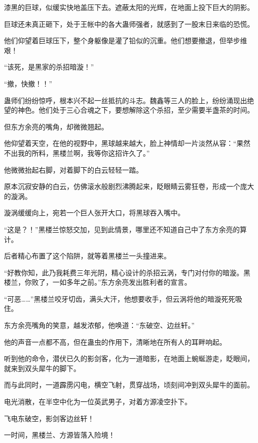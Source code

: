 \begin{this_body}
漆黑的巨球，似缓实快地盖压下去。遮蔽太阳的光辉，在地面上投下巨大的阴影。

巨球还未真正砸下，处于王帐中的各大蛊师强者，就感到了一股末日来临的恐慌。

他们仰望着巨球压下，整个身躯像是灌了铅似的沉重。他们想要撤退，但举步维艰！

“该死，是黑家的杀招暗漩！”

“撤，快撤！！”

蛊师们纷纷惊呼，根本兴不起一丝抵抗的斗志。魏鑫等三人的脸上，纷纷涌现出绝望的神色。他们处于三心合魂之下，要想解除这个杀招，至少需要半盏茶的时间。

但东方余亮的嘴角，却微微翘起。

他仰望着天空，在他的视野中，黑球越来越大，脸上神情却一片淡然从容：“果然不出我的所料，黑楼兰啊，我等你这招许久了。”

他微微抬起右脚，对着脚下的白云轻轻一踏。

原本沉寂安静的白云，仿佛滚水般剧烈沸腾起来，眨眼睛云雾狂卷，形成一个庞大的漩涡。

漩涡缓缓向上，宛若一个巨人张开大口，将黑球吞入嘴中。

“这是？！”黑楼兰惊怒交加，见到此情景，哪里还不知道自己中了东方余亮的算计。

后者精心布置了这个陷阱，就等着黑楼兰一头撞进来。

“好教你知，此乃我耗费三年光阴，精心设计的杀招云涡，专门对付你的暗漩。黑楼兰，你败了，一如多年之前。”东方余亮发出胜利者的宣言。

“可恶……”黑楼兰咬牙切齿，满头大汗，他想要收手，但云涡将他的暗漩死死吸住。

东方余亮嘴角的笑意，越发浓郁，他唤道：“东破空、边丝轩。”

他的声音一点都不高，但在蛊虫的作用下，清晰地在所有人的耳畔响起。

听到他的命令，潜伏已久的影剑客，化为一道暗影，在地面上蜿蜒游走，眨眼间，就来到双头犀牛的脚下。

而与此同时，一道霹雳闪电，横空飞射，贯穿战场，顷刻间冲到双头犀牛的面前。

电光消散，在半空中化为一位英武男子，对着方源凌空扑下。

飞电东破空，影剑客边丝轩！

一时间，黑楼兰、方源皆落入险境！

\end{this_body}

